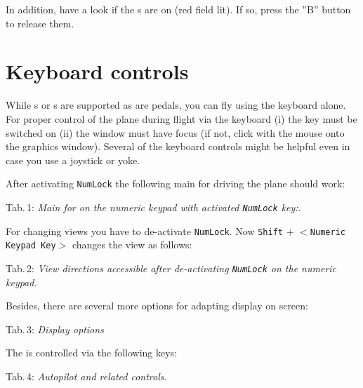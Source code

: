 In addition, have a look if the s are on (red field lit). If so, press the ''B'' button to release them.

\section{Keyboard controls}

While s or s are supported as are  pedals, you
can fly \FlightGear{} using the keyboard alone. For proper control of the plane during
flight via the keyboard (i) the \texttt{} key must be switched on (ii) the
\FlightGear{} window must have focus (if not, click with the mouse onto the graphics
window). Several of the keyboard controls might be helpful even in case you use a
joystick or yoke.

After activating \texttt{NumLock} the following main  for driving the plane should work:
 \eject

\noindent
 Tab.\,1: \textit{Main  for \FlightGear{} on the numeric keypad with
 activated \texttt{NumLock} key:}.
\medskip

\centerline{}
\vskip5mm

For changing views you have to de-activate \texttt{NumLock}. Now \texttt{Shift} +
$<$\texttt{Numeric Keypad Key}$>$ changes the view as follows:
\medskip

\noindent
 Tab.\,2: \textit{View directions
accessible after de-activating \texttt{NumLock} on the numeric keypad.}
\medskip

\centerline{}
\vskip5mm

Besides, there are several more options for adapting display on screen:
\vfill
\eject

\noindent
 Tab.\,3: \textit{Display options}
\medskip

\centerline{}
\vskip5mm

The  is controlled via the following keys:
\medskip

\noindent
 Tab.\,4: \textit{Autopilot and related controls.}
\medskip

\centerline{}
\medskip

